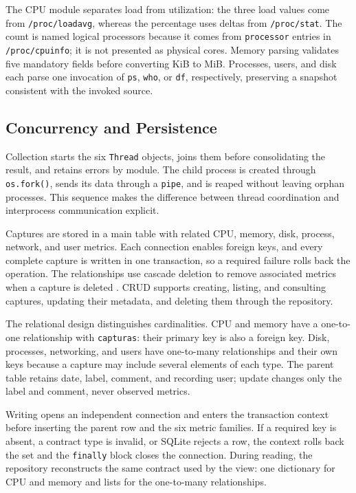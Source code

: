 \documentclass[conference]{IEEEtran}
\begin{document}
The CPU module separates load from utilization: the three load values come from \texttt{/proc/loadavg}, whereas the percentage uses deltas from \texttt{/proc/stat}. The count is named logical processors because it comes from \texttt{processor} entries in \texttt{/proc/cpuinfo}; it is not presented as physical cores. Memory parsing validates five mandatory fields before converting KiB to MiB. Processes, users, and disk each parse one invocation of \texttt{ps}, \texttt{who}, or \texttt{df}, respectively, preserving a snapshot consistent with the invoked source.

\subsection{Concurrency and Persistence}
Collection starts the six \texttt{Thread} objects, joins them before consolidating the result, and retains errors by module. The child process is created through \texttt{os.fork()}, sends its data through a \texttt{pipe}, and is reaped without leaving orphan processes. This sequence makes the difference between thread coordination and interprocess communication explicit.

Captures are stored in a main table with related CPU, memory, disk, process, network, and user metrics. Each connection enables foreign keys, and every complete capture is written in one transaction, so a required failure rolls back the operation. The relationships use cascade deletion to remove associated metrics when a capture is deleted \cite{sqlitefk,sqlitetransactions}. CRUD supports creating, listing, and consulting captures, updating their metadata, and deleting them through the repository.

The relational design distinguishes cardinalities. CPU and memory have a one-to-one relationship with \texttt{capturas}: their primary key is also a foreign key. Disk, processes, networking, and users have one-to-many relationships and their own keys because a capture may include several elements of each type. The parent table retains date, label, comment, and recording user; update changes only the label and comment, never observed metrics.

Writing opens an independent connection and enters the transaction context before inserting the parent row and the six metric families. If a required key is absent, a contract type is invalid, or SQLite rejects a row, the context rolls back the set and the \texttt{finally} block closes the connection. During reading, the repository reconstructs the same contract used by the view: one dictionary for CPU and memory and lists for the one-to-many relationships.
\end{document}
